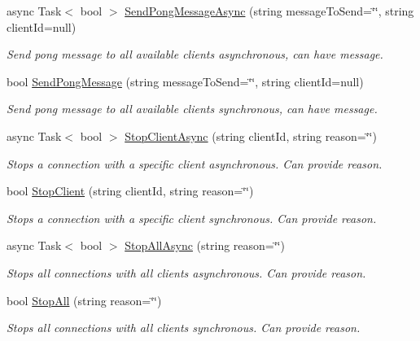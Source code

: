 \begin{DoxyCompactItemize}
async Task$<$ bool $>$ \mbox{\hyperlink{class_simple_web_socket_server_library_1_1_simple_web_socket_server_a20bd2a898b9465f492a5b19c4a8e1021}{Send\+Pong\+Message\+Async}} (string message\+To\+Send=\char`\"{}\char`\"{}, string client\+Id=null)
\begin{DoxyCompactList}\small\item\em Send pong message to all available clients asynchronous, can have message. \end{DoxyCompactList}\item 
bool \mbox{\hyperlink{class_simple_web_socket_server_library_1_1_simple_web_socket_server_af1f35a19ed0272c0bd02bf51f175b4b7}{Send\+Pong\+Message}} (string message\+To\+Send=\char`\"{}\char`\"{}, string client\+Id=null)
\begin{DoxyCompactList}\small\item\em Send pong message to all available clients synchronous, can have message. \end{DoxyCompactList}\item 
async Task$<$ bool $>$ \mbox{\hyperlink{class_simple_web_socket_server_library_1_1_simple_web_socket_server_ad0559ffe3b936e25e202b205fa2931a7}{Stop\+Client\+Async}} (string client\+Id, string reason=\char`\"{}\char`\"{})
\begin{DoxyCompactList}\small\item\em Stops a connection with a specific client asynchronous. Can provide reason. \end{DoxyCompactList}\item 
bool \mbox{\hyperlink{class_simple_web_socket_server_library_1_1_simple_web_socket_server_a15254218104e0b1a6af5363c7b0810a6}{Stop\+Client}} (string client\+Id, string reason=\char`\"{}\char`\"{})
\begin{DoxyCompactList}\small\item\em Stops a connection with a specific client synchronous. Can provide reason. \end{DoxyCompactList}\item 
async Task$<$ bool $>$ \mbox{\hyperlink{class_simple_web_socket_server_library_1_1_simple_web_socket_server_a1bb139b6266636ee732e584926844fdf}{Stop\+All\+Async}} (string reason=\char`\"{}\char`\"{})
\begin{DoxyCompactList}\small\item\em Stops all connections with all clients asynchronous. Can provide reason. \end{DoxyCompactList}\item 
bool \mbox{\hyperlink{class_simple_web_socket_server_library_1_1_simple_web_socket_server_ad80184887910735a4caa22b903ee5fd1}{Stop\+All}} (string reason=\char`\"{}\char`\"{})
\begin{DoxyCompactList}\small\item\em Stops all connections with all clients synchronous. Can provide reason. \end{DoxyCompactList}\end{DoxyCompactItemize}
